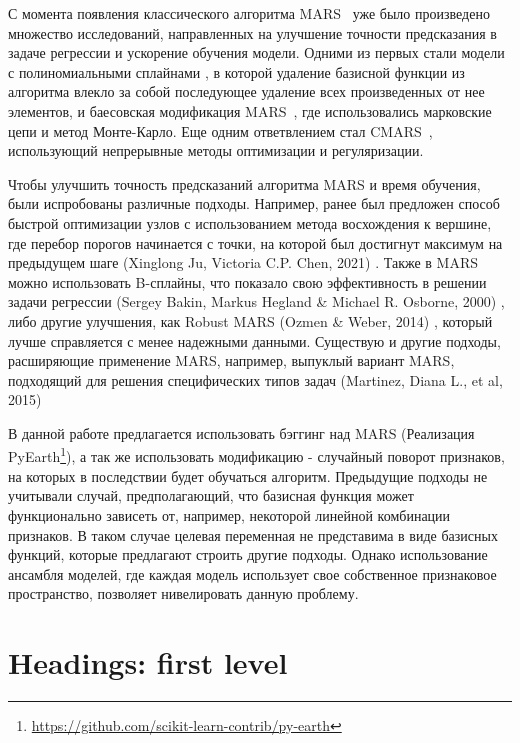 \documentclass{article}
\begin{document}
С момента появления классического алгоритма MARS~\cite{friedman1991multivariate} уже было произведено множество исследований, направленных на улучшение точности предсказания в задаче регрессии и ускорение обучения модели. Одними из первых стали модели с полиномиальными сплайнами \cite{stone1997polynomial}, в которой удаление базисной функции из алгоритма влекло за собой последующее удаление всех произведенных от нее элементов, и баесовская модификация MARS~\cite{denison1998bayesian}, где использовались марковские цепи и метод Монте-Карло.
Еще одним ответвлением стал CMARS~\cite{weber2012cmars}, использующий непрерывные методы оптимизации и регуляризации. 

Чтобы улучшить точность предсказаний алгоритма MARS и время обучения, были испробованы различные подходы. Например, ранее был предложен способ быстрой оптимизации узлов с использованием метода восхождения к вершине, где перебор порогов начинается с точки, на которой был достигнут максимум на предыдущем шаге (Xinglong Ju, Victoria C.P. Chen, 2021) \cite{ju2021fast}. Также в MARS можно использовать B-сплайны, что показало свою эффективность в решении задачи регрессии (Sergey Bakin, Markus Hegland \& Michael R. Osborne, 2000) \cite{bakin2000parallel}, либо другие улучшения, как Robust MARS (Ozmen \& Weber, 2014) \cite{ozmen2011rcmars}, который лучше справляется с менее надежными данными. Существую и другие подходы, расширяющие применение MARS, например, выпуклый вариант MARS, подходящий для решения специфических типов задач (Martinez, Diana L., et al, 2015)\cite{martinez2015convex}

В данной работе предлагается использовать бэггинг над MARS (Реализация PyEarth\footnote{\url{https://github.com/scikit-learn-contrib/py-earth}}), а так же использовать модификацию - случайный поворот признаков, на которых в последствии будет обучаться алгоритм. Предыдущие подходы не учитывали случай, предполагающий, что базисная функция может функционально зависеть от, например, некоторой линейной комбинации признаков. В таком случае целевая переменная не представима в виде базисных функций, которые предлагают строить другие подходы. Однако использование ансамбля моделей, где каждая модель использует свое собственное признаковое пространство, позволяет нивелировать данную проблему.

\section{Headings: first level}
\label{sec:headings}
\end{document}
